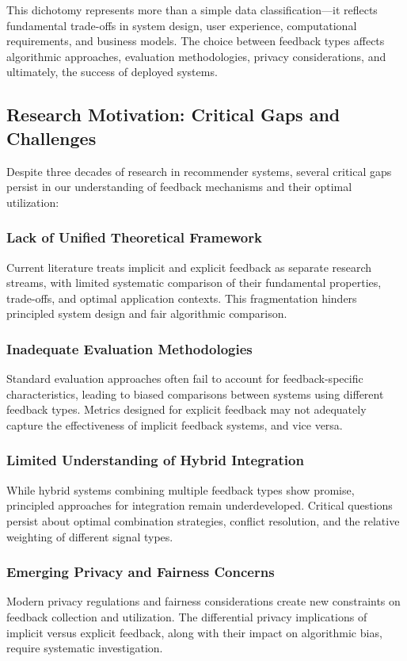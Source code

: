 This dichotomy represents more than a simple data classification—it reflects fundamental trade-offs in system design, user experience, computational requirements, and business models. The choice between feedback types affects algorithmic approaches, evaluation methodologies, privacy considerations, and ultimately, the success of deployed systems.

\subsection{Research Motivation: Critical Gaps and Challenges}

Despite three decades of research in recommender systems, several critical gaps persist in our understanding of feedback mechanisms and their optimal utilization:

\subsubsection{Lack of Unified Theoretical Framework}
Current literature treats implicit and explicit feedback as separate research streams, with limited systematic comparison of their fundamental properties, trade-offs, and optimal application contexts. This fragmentation hinders principled system design and fair algorithmic comparison.

\subsubsection{Inadequate Evaluation Methodologies}
Standard evaluation approaches often fail to account for feedback-specific characteristics, leading to biased comparisons between systems using different feedback types. Metrics designed for explicit feedback may not adequately capture the effectiveness of implicit feedback systems, and vice versa.

\subsubsection{Limited Understanding of Hybrid Integration}
While hybrid systems combining multiple feedback types show promise, principled approaches for integration remain underdeveloped. Critical questions persist about optimal combination strategies, conflict resolution, and the relative weighting of different signal types.

\subsubsection{Emerging Privacy and Fairness Concerns}
Modern privacy regulations and fairness considerations create new constraints on feedback collection and utilization. The differential privacy implications of implicit versus explicit feedback, along with their impact on algorithmic bias, require systematic investigation.

